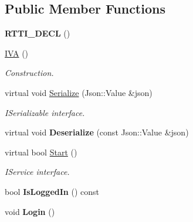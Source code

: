 \subsection*{Public Member Functions}
\begin{DoxyCompactItemize}
\item 
\mbox{\label{class_i_v_a_a01d85de78968b86a32ca130ae0fe799a}} 
{\bfseries R\+T\+T\+I\+\_\+\+D\+E\+CL} ()
\item 
\mbox{\label{class_i_v_a_a2f89a2a265f6dd7cf7a3eddf6ebb3646}} 
\hyperlink{class_i_v_a_a2f89a2a265f6dd7cf7a3eddf6ebb3646}{I\+VA} ()
\begin{DoxyCompactList}\small\item\em Construction. \end{DoxyCompactList}\item 
\mbox{\label{class_i_v_a_ad7fd44b0c20536b24029e4a8055f7142}} 
virtual void \hyperlink{class_i_v_a_ad7fd44b0c20536b24029e4a8055f7142}{Serialize} (Json\+::\+Value \&json)
\begin{DoxyCompactList}\small\item\em I\+Serializable interface. \end{DoxyCompactList}\item 
\mbox{\label{class_i_v_a_a387d056a6afe666461faa5e8ead6d8c4}} 
virtual void {\bfseries Deserialize} (const Json\+::\+Value \&json)
\item 
\mbox{\label{class_i_v_a_a58253fd87350524f81c77ef8b7ad3394}} 
virtual bool \hyperlink{class_i_v_a_a58253fd87350524f81c77ef8b7ad3394}{Start} ()
\begin{DoxyCompactList}\small\item\em I\+Service interface. \end{DoxyCompactList}\item 
\mbox{\label{class_i_v_a_aeb672e35cf8d4dfd6b9fa48b5480c953}} 
bool {\bfseries Is\+Logged\+In} () const
\item 
\mbox{\label{class_i_v_a_a2439fdf64e03842250815c51a3333245}} 
void {\bfseries Login} ()
\item 
\mbox{\label{class_i_v_a_ab72fafe17f99f3ca7d01cdb8a9fa9691}} 

\end{DoxyCompactItemize}

